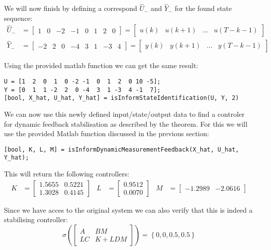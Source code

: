 We will now finish by defining a correspond $\hat{U}_-$ and $\hat{Y}_-$ for the found state sequence:
\begin{align*}
	\hat{U}_- &= \begin{bmatrix} 1&0&-2&-1&0&1&2&0 \end{bmatrix} = \begin{bmatrix} u(k) & u(k+1) & \dots & u(T-k-1) \end{bmatrix}\\
	\hat{Y}_- &= \begin{bmatrix} -2&2&0&-4&3&1&-3&4 \end{bmatrix} = \begin{bmatrix} y(k) & y(k+1) & \dots & y(T-k-1) \end{bmatrix}
\end{align*}

Using the provided matlab function  we can get the same result:
\begin{lstlisting}
U = [1  2  0  1  0 -2 -1  0  1  2  0 10 -5];
Y = [0  1  1 -2  2  0 -4  3  1 -3  4 -1  7];
[bool, X_hat, U_hat, Y_hat] = isInformStateIdentification(U, Y, 2)
\end{lstlisting}


We can now use this newly defined input/state/output data to find a controler for dynamic feedback stabilisation as described by the theorem. For this we will use the provided Matlab function discussed in the previous section:
\begin{lstlisting}
[bool, K, L, M] = isInformDynamicMeasurementFeedback(X_hat, U_hat, Y_hat);
\end{lstlisting}
This will return the following controllers:
\begin{align*}
K &= \begin{bmatrix} 1.5655&0.5221\\1.3028&0.4145 \end{bmatrix} &
L &= \begin{bmatrix} 0.9512\\0.0070 \end{bmatrix} &
M &= \begin{bmatrix} -1.2989&-2.0616 \end{bmatrix} 
\end{align*}

Since we have acces to the original system we can also verify that this is indeed a stabilising controller:
\[ \sigma\left( \begin{bmatrix} A & BM \\ LC & K + LDM \end{bmatrix} \right)  = \left\{ 0,0,0.5,0.5 \right\}\]
